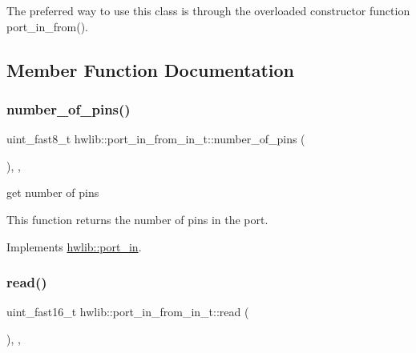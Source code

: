 The preferred way to use this class is through the overloaded constructor function port\+\_\+in\+\_\+from(). 

\subsection{Member Function Documentation}
\mbox{\label{classhwlib_1_1port__in__from__in__t_a7a0d1cc244540a8183118c778d92deb2}} 
\subsubsection{\texorpdfstring{number\+\_\+of\+\_\+pins()}{number\_of\_pins()}}
{\footnotesize\ttfamily uint\+\_\+fast8\+\_\+t hwlib\+::port\+\_\+in\+\_\+from\+\_\+in\+\_\+t\+::number\+\_\+of\+\_\+pins (\begin{DoxyParamCaption}{ }\end{DoxyParamCaption})\hspace{0.3cm}{\ttfamily [inline]}, {\ttfamily [override]}, {\ttfamily [virtual]}}





get number of pins

This function returns the number of pins in the port. 

Implements \hyperlink{classhwlib_1_1port__in_a3498fc0158e1e460a00d671df629fe22}{hwlib\+::port\+\_\+in}.

\mbox{\label{classhwlib_1_1port__in__from__in__t_a1c95b00a18f0df57064490c18e2dd96b}} 
\subsubsection{\texorpdfstring{read()}{read()}}
{\footnotesize\ttfamily uint\+\_\+fast16\+\_\+t hwlib\+::port\+\_\+in\+\_\+from\+\_\+in\+\_\+t\+::read (\begin{DoxyParamCaption}{ }\end{DoxyParamCaption})\hspace{0.3cm}{\ttfamily [inline]}, {\ttfamily [override]}, {\ttfamily [virtual]}}





